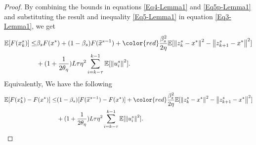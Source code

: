 \documentclass[10pt, conference, compsocconf]{IEEEtran}
\newcommand*{\E}{\mathbb{E}}
\newcommand{\norm}[1]{\left\lVert#1\right\rVert}
\theoremstyle{definition}
\theoremstyle{remark}
\begin{document}
\begin{proof}
By combining the bounds in equations \eqref{Eq4-Lemma1} and \eqref{Eq5p-Lemma1} and substituting the result and inequality \eqref{Eq5-Lemma1} in equation \eqref{Eq3-Lemma1}, we get
\begin{equation}
\begin{split}
\E[F(x_k^s)] \leq &\beta_s F(x^*)+(1-\beta_s)F(\widetilde{x}^{s-1}) + {\color{red}\frac{\beta_s^2}{2\eta}}\E[\norm{z_{k}^s-x^*}^2-\norm{z_{k+1}^s-x^*}^2]\\
&+(1+\frac{1}{2\theta_{\eta}})L\tau\eta^2\sum_{i = k-\tau}^{k-1}\E[\norm{u_{i}^s}^2]. 
\end{split}
\end{equation}
Equivalently, We have the following
\begin{equation}\label{main-ine-Lemma1}
\begin{split}
\E[F(x_k^s)-F(x^*)] \leq &(1-\beta_s)[F(\widetilde{x}^{s-1})-F(x^*)] + {\color{red}\frac{ \beta_s^2}{2\eta}}\E[\norm{z_{k}^s-x^*}^2-\norm{z_{k+1}^s-x^*}^2]\\
&+(1+\frac{1}{2\theta_{\eta}})L\tau\eta^2\sum_{i = k-\tau}^{k-1}\E[\norm{u_{i}^s}^2]. 
\end{split}
\end{equation}


\end{proof}
\end{document}
